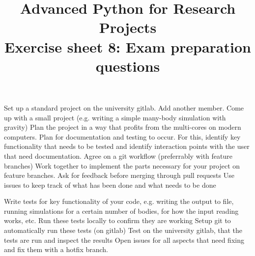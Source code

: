 \documentclass[]{erlangen-problemset}
\title{{\Large Advanced Python for Research Projects} \\[0.3cm] 
Exercise sheet 8: Exam preparation questions }
\begin{document}


\begin{problem}[title={Working with other members}]
\noindent
\Question 
\end{problem}


\begin{problem}[title={Working with other members}]
\noindent
\Question Set up a standard project on the university gitlab.
\Question Add another member.
\Question Come up with a small project (e.g. writing a simple many-body simulation with gravity)
\Question Plan the project in a way that profits from the multi-cores on modern computers. Plan for documentation and testing to occur. 
For this, identify key functionality that needs to be tested and identify interaction points with the user that need documentation.
\Question Agree on a git workflow (preferrably with feature branches)
\Question Work together to implement the parts necessary for your project on feature branches. Ask for feedback before merging through pull requests
\Question Use issues to keep track of what has been done and what needs to be done
\end{problem}

\begin{problem}[title={Automated testing}]
\noindent
\Question Write tests for key functionality of your code, e.g. writing the output to file, running simulations for a certain number of bodies, for how the input reading works, etc.
\Question Run these tests locally to confirm they are working
\Question Setup git to automatically run these tests (on gitlab)
\Question Test on the university gitlab, that the tests are run and inspect the results
\Question Open issues for all aspects that need fixing and fix them with a hotfix branch. 
\end{problem}

\end{document}
